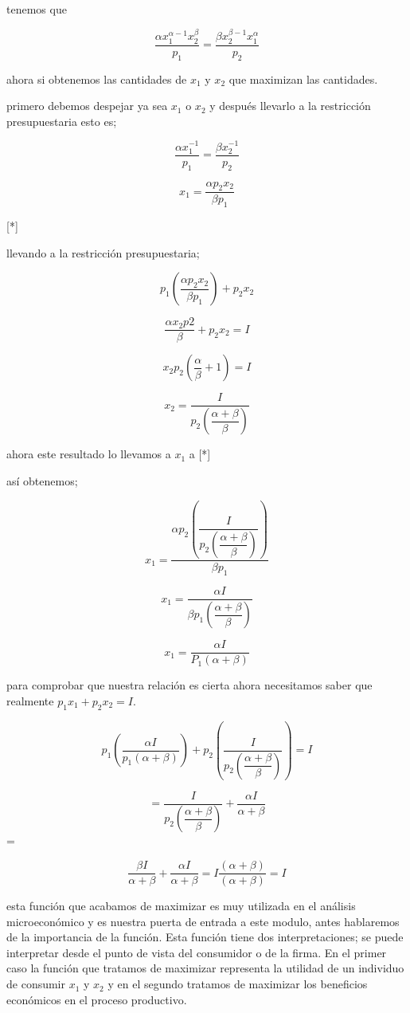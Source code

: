 \documentclass[12pt]{article}
\begin{document}
{tenemos que 

$$\dfrac{\alpha x_{1}^{\alpha -1} x_{2}^{\beta}}{p_{1}}=  \dfrac{\beta x_{2}^{\beta -1}x_{1}^{\alpha}}{p_{2}}$$

ahora si obtenemos las cantidades de $x_{1}$ y $x_{2}$ que maximizan las cantidades.

primero debemos despejar ya sea $x_{1}$ o $x_{2}$ y después llevarlo a la restricción presupuestaria esto es;


$$ \dfrac{ \alpha x_{1}^{-1}}{p_{1}} = \dfrac{\beta x_{2}^{-1}}{p_{2}}$$


$$x_{1}= \dfrac{\alpha p_{2} x_{2}}{\beta p_{1}}$$

[*]

llevando a la restricción presupuestaria;

$$ p_{1} \left( \dfrac{\alpha p_{2} x_{2}}{\beta p_{1}} \right) + p_{2} x_{2} $$

$$ \dfrac{ \alpha x_{2} p{2} }{\beta} + p_{2}x_{2}= I$$

$$x_{2}p_{2}(\dfrac{\alpha}{\beta}+1) = I$$

$$x_{2}=\dfrac{I}{p_{2}  \left(   \dfrac{\alpha + \beta }{\beta} \right)}$$

ahora este resultado lo llevamos a $x_{1}$  a [*]

así obtenemos;

$$ x_{1} = \dfrac{\alpha p_{2} \left( \dfrac {I} {p_{2} \left( \dfrac{\alpha + \beta} {\beta} \right)} \right)} {\beta p_{1}} $$

$$x_{1}= \dfrac{\alpha I }{\beta p_{1} \left( \dfrac{ \alpha + \beta}{\beta} \right) } $$


$$ x_{1} =  \dfrac{\alpha I}{P_{1}(\alpha + \beta)}$$


para comprobar que nuestra relación es cierta ahora necesitamos  saber que realmente $p_{1}x_{1}+p_{2}x_{2}=I$.


$$p_{1} \left( \dfrac{\alpha I}{p_{1} (\alpha + \beta) } \right) + p_{2} \left(  \dfrac{I}{p_{2} \left( \dfrac{\alpha + \beta}{\beta} \right)} \right )= I $$






 $$ = \dfrac{I}{ p_{2} \left( \dfrac{\alpha + \beta}{\beta} \right)} + \dfrac{\alpha I}{\alpha + \beta} $$ = 


$$\dfrac{ \beta I}{\alpha + \beta } + \dfrac{\alpha I}{\alpha + \beta} =I \dfrac{(\alpha + \beta)}{(\alpha + \beta)}= I$$

esta función que acabamos de maximizar es muy utilizada en el análisis microeconómico y es nuestra puerta de entrada a este modulo, antes hablaremos de la importancia de la función. Esta función tiene dos interpretaciones;  se puede interpretar desde el punto de vista del consumidor o de la firma. En el primer caso la función que tratamos de maximizar representa la utilidad de un individuo de  consumir $x_{1}$ y $x_{2}$ y en el segundo tratamos de maximizar los beneficios económicos en el proceso productivo.

}
\end{document}
